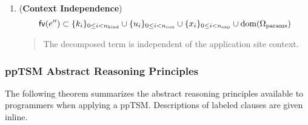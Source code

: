 \begin{theorem}
\begin{enumerate}
	\item (\textbf{Context Independence}) \[\mathsf{fv}(e'') \subset \{k_i\}_{0 \leq i < n_\text{kind}} \cup \{u_i\}_{0 \leq i < n_\text{con}} \cup \{x_i\}_{0 \leq i < n_\text{exp}} \cup \text{dom}(\Omega_\text{params})\]
		\begin{quote}
			The decomposed term is independent of the application site context.
		\end{quote}
\end{enumerate}
\end{theorem}
\endgroup

\subsubsection{ppTSM Abstract Reasoning Principles}
The following theorem summarizes the abstract reasoning principles available to programmers when applying a ppTSM. Descriptions of labeled clauses are given inline.

